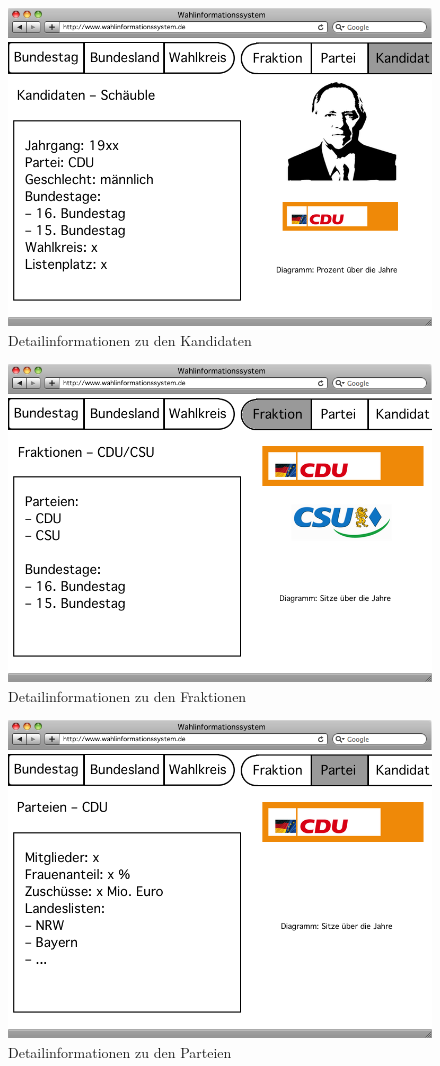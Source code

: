 \documentclass[a4paper]{article}
\begin{document}
\begin{figure}[h!]
\centering
\includegraphics[scale=0.4]{Mockups/kandidat}
\caption{Detailinformationen zu den Kandidaten}
\end{figure}

\begin{figure}[h!]
\centering
\includegraphics[scale=0.4]{Mockups/fraktion}
\caption{Detailinformationen zu den Fraktionen}
\end{figure}

\begin{figure}[h!]
\centering
\includegraphics[scale=0.4]{Mockups/partei}
\caption{Detailinformationen zu den Parteien}
\end{figure}
\end{document}
